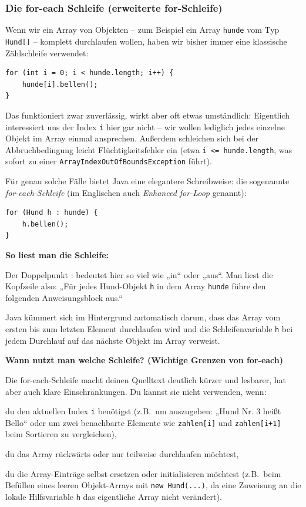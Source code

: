 \subsubsection{Die for-each Schleife (erweiterte for-Schleife) \tagZusatz \tagLK}

Wenn wir ein Array von Objekten – zum Beispiel ein Array \lstinline|hunde| vom Typ 
\lstinline|Hund[]| -- komplett durchlaufen wollen, haben wir bisher immer eine 
klassische Zählschleife verwendet:

\begin{lstlisting}
for (int i = 0; i < hunde.length; i++) {
    hunde[i].bellen();
}
\end{lstlisting}

Das funktioniert zwar zuverlässig, wirkt aber oft etwas umständlich: Eigentlich 
interessiert uns der Index \lstinline|i| hier gar nicht – wir wollen lediglich 
jedes einzelne Objekt im Array einmal ansprechen. Außerdem schleichen sich bei 
der Abbruchbedingung leicht Flüchtigkeitsfehler ein (etwa \lstinline|i <= hunde.length|, 
was sofort zu einer \lstinline|ArrayIndexOutOfBoundsException| führt).

Für genau solche Fälle bietet Java eine elegantere Schreibweise: die sogenannte 
\emph{for-each-Schleife} (im Englischen auch \emph{Enhanced for-Loop} genannt):

\begin{lstlisting}
for (Hund h : hunde) {
    h.bellen();
}
\end{lstlisting}

\textbf{So liest man die Schleife:}

Der Doppelpunkt : bedeutet hier so viel wie „in“ oder „aus“. Man liest die 
Kopfzeile also: „Für jedes Hund-Objekt \lstinline|h| in dem Array \lstinline|hunde|
führe den folgenden Anweisungsblock aus.“

Java kümmert sich im Hintergrund automatisch darum, dass das Array vom ersten 
bis zum letzten Element durchlaufen wird und die Schleifenvariable \lstinline|h| 
bei jedem Durchlauf auf das nächste Objekt im Array verweist.

\textbf{Wann nutzt man welche Schleife? (Wichtige Grenzen von for-each)}

Die for-each-Schleife macht deinen Quelltext deutlich kürzer und lesbarer, hat aber 
auch klare Einschränkungen. Du kannst sie nicht verwenden, wenn:

\begin{compactitem}
\item du den aktuellen Index \lstinline|i| benötigst (z.B.\ um auszugeben: 
„Hund Nr. 3 heißt Bello“ oder um zwei benachbarte Elemente wie \lstinline|zahlen[i]| und 
\lstinline|zahlen[i+1]| beim Sortieren zu vergleichen),
\item du das Array rückwärts oder nur teilweise durchlaufen möchtest,
\item du die Array-Einträge selbst ersetzen oder initialisieren möchtest 
(z.B.\ beim Befüllen eines leeren Objekt-Arrays mit \lstinline|new Hund(...)|, da 
eine Zuweisung an die lokale Hilfsvariable \lstinline|h| das eigentliche Array nicht 
verändert).
\end{compactitem}

